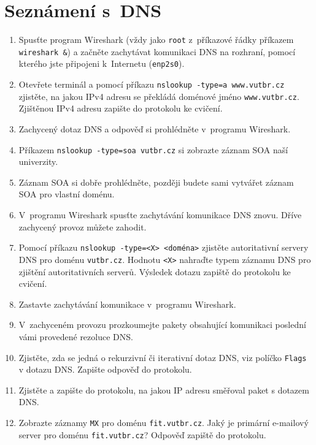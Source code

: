 \section{Seznámení s~DNS}
\begin{enumerate}
    \item Spusťte program Wireshark (vždy jako \texttt{root} z~příkazové řádky příkazem \texttt{wireshark \&}) a začněte zachytávat komunikaci DNS na rozhraní, pomocí kterého jste připojeni k~Internetu (\texttt{enp2s0}).
    \item Otevřete terminál a pomocí příkazu \texttt{nslookup -type=a www.vutbr.cz} zjistěte, na jakou IPv4 adresu se překládá doménové jméno \texttt{www.vutbr.cz}. Zjištěnou IPv4 adresu zapište do protokolu ke cvičení.
    \item Zachycený dotaz DNS a odpověď si prohlédněte v~programu Wireshark.
    \item Příkazem \texttt{nslookup -type=soa vutbr.cz} si zobrazte záznam SOA naší univerzity.
    \item Záznam SOA si dobře prohlédněte, později budete sami vytvářet záznam SOA pro vlastní doménu.
    \item V~programu Wireshark spusťte zachytávání komunikace DNS znovu. Dříve zachycený provoz můžete zahodit.
    \item Pomocí příkazu \texttt{nslookup -type=<X> <doména>} zjistěte autoritativní servery DNS pro doménu \texttt{vutbr.cz}. Hodnotu \texttt{<X>} nahraďte typem záznamu DNS pro zjištění autoritativních serverů. Výsledek dotazu zapiště do protokolu ke cvičení.
    \item Zastavte zachytávání komunikace v~programu Wireshark.
    \item V~zachyceném provozu prozkoumejte pakety obsahující komunikaci poslední vámi provedené rezoluce DNS.
    \item Zjistěte, zda se jedná o rekurzivní či iterativní dotaz DNS, viz políčko \texttt{Flags} v dotazu DNS. Zapište odpověď do protokolu.
    \item Zjistěte a zapište do protokolu, na jakou IP adresu směřoval paket s dotazem DNS.
    \item Zobrazte záznamy \texttt{MX} pro doménu \texttt{fit.vutbr.cz}. Jaký je primární e-mailový server pro doménu \texttt{fit.vutbr.cz}? Odpověď zapiště do protokolu.
\end{enumerate}

